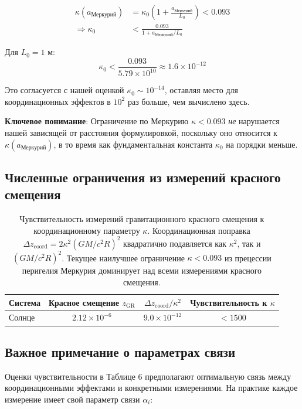 \documentclass[11pt,a4paper]{article}
\begin{document}
	\begin{align}
		\kappa(a_{\text{Меркурий}}) &= \kappa_0 \left(1 + \frac{a_{\text{Меркурий}}}{L_0}\right) < 0.093 \\
		\Rightarrow \kappa_0 &< \frac{0.093}{1 + a_{\text{Меркурий}}/L_0}
	\end{align}
	
	Для $L_0 = 1$ м:
	\begin{equation}
		\kappa_0 < \frac{0.093}{5.79 \times 10^{10}} \approx 1.6 \times 10^{-12}
	\end{equation}
	
	Это согласуется с нашей оценкой $\kappa_0 \sim 10^{-14}$, оставляя место для 
	координационных эффектов в $10^2$ раз больше, чем вычислено здесь.
	
	\textbf{Ключевое понимание}: Ограничение по Меркурию $\kappa < 0.093$ \textit{не} нарушается 
	нашей зависящей от расстояния формулировкой, поскольку оно относится к $\kappa(a_{\text{Меркурий}})$, 
	в то время как фундаментальная константа $\kappa_0$ на порядки меньше.
	\subsection{Численные ограничения из измерений красного смещения}
	
	\begin{table}[htbp]
		\centering
		\begin{tabular}{lccc}
			\toprule
			\textbf{Система} & \textbf{Красное смещение $z_{\text{GR}}$} & \textbf{$\Delta z_{\text{coord}}/\kappa^2$} & \textbf{Чувствительность к $\kappa$} \\
			\midrule
			Солнце & $2.12\times10^{-6}$ & $9.0\times10^{-12}$ & $<1500$ \\
		\end{tabular}
		\caption{Чувствительность измерений гравитационного красного смещения к координационному параметру $\kappa$. 
			Координационная поправка $\Delta z_{\text{coord}} = 2\kappa^2 (GM/c^2R)^2$ квадратично подавляется 
			как $\kappa^2$, так и $(GM/c^2R)^2$. Текущее наилучшее ограничение $\kappa < 0.093$ из 
			прецессии перигелия Меркурия доминирует над всеми измерениями красного смещения.}
	\end{table}
	\subsection{Важное примечание о параметрах связи}
	
	Оценки чувствительности в Таблице 6 предполагают оптимальную связь между координационными эффектами и конкретными измерениями. На практике каждое измерение имеет свой параметр связи $\alpha_i$:
	
\end{document}
